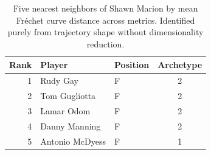 \begin{table}[htbp]
  \centering\small
  \begin{tabular}{rllc}
    \toprule
    Rank & Player & Position & Archetype \\
    \midrule
    1 & Rudy Gay & F & 2 \\
    2 & Tom Gugliotta & F & 2 \\
    3 & Lamar Odom & F & 2 \\
    4 & Danny Manning & F & 2 \\
    5 & Antonio McDyess & F & 1 \\
    \bottomrule
  \end{tabular}
  \caption{Five nearest neighbors of Shawn Marion by mean Fr\'{e}chet curve distance across metrics. Identified purely from trajectory shape without dimensionality reduction.}
  \label{tab:Shawn_Marion_frechet_curve_neighbors}
\end{table}

